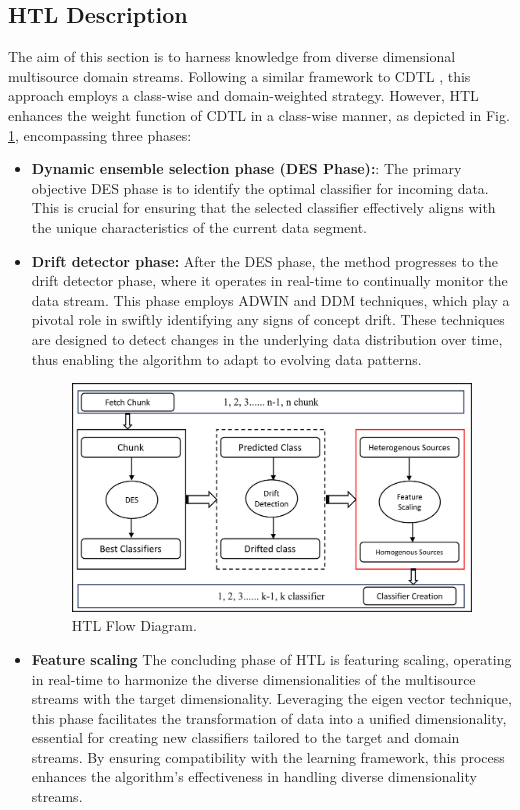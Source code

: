 \subsection{HTL Description}

The aim of this section is to harness knowledge from diverse dimensional multisource domain streams. Following a similar framework to CDTL \cite{yang2021concept}, this approach employs a class-wise and domain-weighted strategy. However, HTL enhances the weight function of CDTL in a class-wise manner, as depicted in Fig. \ref{fig:6_alg1}, encompassing three phases:

\begin{itemize}
	\setlength{\itemsep}{0pt}
    \setlength{\parskip}{0pt}
	\item \textbf{Dynamic ensemble selection phase (DES Phase):}: The primary objective DES phase is to identify the optimal classifier for incoming data. This is crucial for ensuring that the selected classifier effectively aligns with the unique characteristics of the current data segment.
	\item \textbf{Drift detector phase:} After the DES phase, the method progresses to the drift detector phase, where it operates in real-time to continually monitor the data stream. This phase employs ADWIN and DDM techniques, which play a pivotal role in swiftly identifying any signs of concept drift. These techniques are designed to detect changes in the underlying data distribution over time, thus enabling the algorithm to adapt to evolving data patterns.
	\begin{figure}[H]
		\centering
		\includegraphics[width=0.8\linewidth]{6_transfer_learning/figures/alg1.png}
	  \caption{HTL Flow Diagram.}
		\label{fig:6_alg1}
	\end{figure}

	\item \textbf{Feature scaling} The concluding phase of HTL is featuring scaling, operating in real-time to harmonize the diverse dimensionalities of the multisource streams with the target dimensionality. Leveraging the eigen vector technique, this phase facilitates the transformation of data into a unified dimensionality, essential for creating new classifiers tailored to the target and domain streams. By ensuring compatibility with the learning framework, this process enhances the algorithm's effectiveness in handling diverse dimensionality streams.
\end{itemize}

